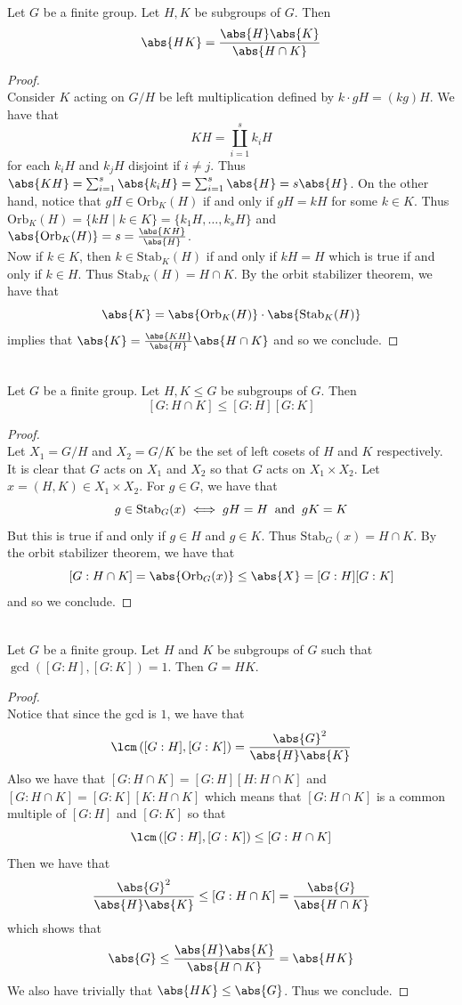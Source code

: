 \documentclass[a4paper]{article}
\begin{document}
\begin{prp}{}{}\\
Let $G$ be a finite group. Let $H,K$ be subgroups of $G$. Then $$\abs{HK}=\frac{\abs{H}\abs{K}}{\abs{H\cap K}}$$ 
\begin{proof}\\
Consider $K$ acting on $G/H$ be left multiplication defined by $k\cdot gH=(kg)H$. We have that $$KH=\coprod_{i=1}^sk_iH$$ for each $k_iH$ and $k_jH$ disjoint if $i\neq j$. Thus $\abs{KH}=\sum_{i=1}^s\abs{k_iH}=\sum_{i=1}^s\abs{H}=s\abs{H}$. On the other hand, notice that $gH\in\text{Orb}_K(H)$ if and only if $gH=kH$ for some $k\in K$. Thus $\text{Orb}_K(H)=\{kH\;|\;k\in K\}=\{k_1H,\dots,k_sH\}$ and $\abs{\text{Orb}_K(H)}=s=\frac{\abs{KH}}{\abs{H}}$. \\

Now if $k\in K$, then $k\in\text{Stab}_K(H)$ if and only if $kH=H$ which is true if and only if $k\in H$. Thus $\text{Stab}_K(H)=H\cap K$. By the orbit stabilizer theorem, we have that $$\abs{K}=\abs{\text{Orb}_K(H)}\cdot\abs{\text{Stab}_K(H)}$$ implies that $\abs{K}=\frac{\abs{KH}}{\abs{H}}\abs{H\cap K}$ and so we conclude. 
\end{proof}
\end{prp}

\begin{prp}{}{}\\
Let $G$ be a finite group. Let $H,K\leq G$ be subgroups of $G$. Then $$[G:H\cap K]\leq[G:H][G:K]$$ 
\begin{proof}\\
Let $X_1=G/H$ and $X_2=G/K$ be the set of left cosets of $H$ and $K$ respectively. It is clear that $G$ acts on $X_1$ and $X_2$ so that $G$ acts on $X_1\times X_2$. Let $x=(H,K)\in X_1\times X_2$. For $g\in G$, we have that $$g\in\text{Stab}_G(x)\iff gH=H\text{\;\;and\;\;}gK=K$$ But this is true if and only if $g\in H$ and $g\in K$. Thus $\text{Stab}_G(x)=H\cap K$. By the orbit stabilizer theorem, we have that $$[G:H\cap K]=\abs{\text{Orb}_G(x)}\leq\abs{X}=[G:H][G:K]$$ and so we conclude. 
\end{proof}
\end{prp}

\begin{prp}{}{}\\
Let $G$ be a finite group. Let $H$ and $K$ be subgroups of $G$ such that $\gcd\left([G:H],[G:K]\right)=1$. Then $G=HK$. 
\begin{proof}\\
Notice that since the gcd is $1$, we have that $$\lcm\left([G:H],[G:K]\right)=\frac{\abs{G}^2}{\abs{H}\abs{K}}$$ Also we have that $[G:H\cap K]=[G:H][H:H\cap K]$ and $[G:H\cap K]=[G:K][K:H\cap K]$ which means that $[G:H\cap K]$ is a common multiple of $[G:H]$ and $[G:K]$ so that $$\lcm\left([G:H],[G:K]\right)\leq[G:H\cap K]$$ Then we have that $$\frac{\abs{G}^2}{\abs{H}\abs{K}}\leq[G:H\cap K]=\frac{\abs{G}}{\abs{H\cap K}}$$ which shows that $$\abs{G}\leq\frac{\abs{H}\abs{K}}{\abs{H\cap K}}=\abs{HK}$$ We also have trivially that $\abs{HK}\leq\abs{G}$. Thus we conclude. 
\end{proof}
\end{prp}
\end{document}
